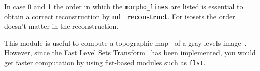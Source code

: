 In case 0 and 1 the order in which the {\tt morpho\_lines} are listed
is essential to obtain a correct reconstruction by {\bf ml\_reconstruct}.
For isosets the order doesn't matter in the reconstruction.

\bigskip 

This module is useful to compute a topographic map~
of a gray levels 
image~\cite{caselles.coll.ea:kanizsa}\cite{caselles.coll.ea:topographic}.
However, since the Fast Level Sets Transform~\cite{monasse.guichard:fast} 
has been implemented, you would get faster computation by using flst-based modules 
such as {\tt flst}.

